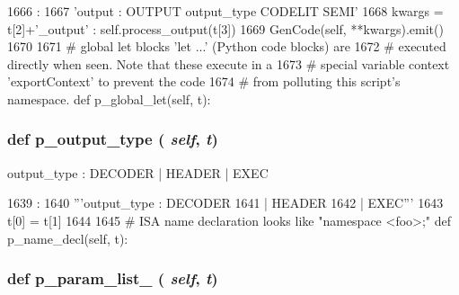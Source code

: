 \begin{DoxyCode}
1666                          :
1667         'output : OUTPUT output_type CODELIT SEMI'
1668         kwargs = { t[2]+'_output' : self.process_output(t[3]) }
1669         GenCode(self, **kwargs).emit()
1670 
1671     # global let blocks 'let {{...}}' (Python code blocks) are
1672     # executed directly when seen.  Note that these execute in a
1673     # special variable context 'exportContext' to prevent the code
1674     # from polluting this script's namespace.
    def p_global_let(self, t):
\end{DoxyCode}
\hypertarget{classisa__parser_1_1ISAParser_a7bda0086bf18eba339523d4f905e4368}{
\subsubsection[{p\_\-output\_\-type}]{\setlength{\rightskip}{0pt plus 5cm}def p\_\-output\_\-type ( {\em self}, \/   {\em t})}}
\label{classisa__parser_1_1ISAParser_a7bda0086bf18eba339523d4f905e4368}
\begin{DoxyVerb}output_type : DECODER
       | HEADER
       | EXEC\end{DoxyVerb}
 


\begin{DoxyCode}
1639                               :
1640         '''output_type : DECODER
1641                        | HEADER
1642                        | EXEC'''
1643         t[0] = t[1]
1644 
1645     # ISA name declaration looks like "namespace <foo>;"
    def p_name_decl(self, t):
\end{DoxyCode}
\hypertarget{classisa__parser_1_1ISAParser_ada36c98a3c763e936519a176c2cafe8f}{
\subsubsection[{p\_\-param\_\-list\_\-0}]{\setlength{\rightskip}{0pt plus 5cm}def p\_\-param\_\-list\_ ( {\em self}, \/   {\em t})}}
\label{classisa__parser_1_1ISAParser_ada36c98a3c763e936519a176c2cafe8f}



